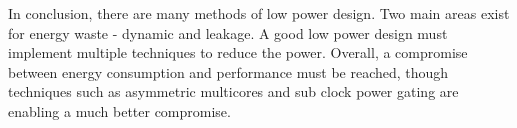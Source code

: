 In conclusion, there are many methods of low power design. 
Two main areas exist for energy waste - dynamic and leakage. 
A good low power design must implement multiple techniques to reduce the power. 
Overall, a compromise between energy consumption and performance must be reached, though techniques such as asymmetric multicores and sub clock power gating are enabling a much better compromise.

